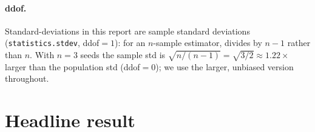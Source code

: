 \documentclass[11pt]{article}
\begin{document}
\paragraph{ddof.} Standard-deviations in this report are sample standard
deviations (\texttt{statistics.stdev}, ddof$=\!1$): for an $n$-sample
estimator, divides by $n\!-\!1$ rather than $n$. With $n\!=\!3$ seeds
the sample std is $\sqrt{n/(n-1)}\!=\!\sqrt{3/2}\!\approx\!1.22\times$
larger than the population std (ddof$=\!0$); we use the larger,
unbiased version throughout.

\section{Headline result}
\end{document}
